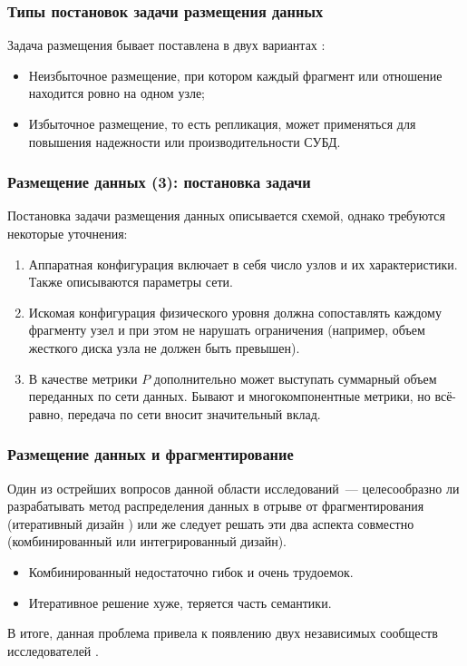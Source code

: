 \documentclass[unicode]{beamer}
\begin{document}
\begin{frame}
\frametitle{Типы постановок задачи размещения данных}

Задача размещения бывает поставлена в двух вариантах \cite{p32}:

\begin{itemize}
  \setlength\itemsep{1em}	
  \item Неизбыточное размещение, при котором каждый фрагмент или отношение находится ровно на одном узле;
  \item Избыточное размещение, то есть репликация, может применяться для повышения надежности или производительности СУБД.
\end{itemize}

\end{frame}


\begin{frame}
\frametitle{Размещение данных (3): постановка задачи}

Постановка задачи размещения данных описывается схемой, однако требуются некоторые уточнения:

\begin{enumerate}
  \setlength\itemsep{1em}	
  \item Аппаратная конфигурация включает в себя число узлов и их характеристики. Также описываются параметры сети.
  \item Искомая конфигурация физического уровня должна сопоставлять каждому фрагменту узел и при этом не нарушать ограничения (например, объем жесткого диска узла не должен быть превышен).
  \item В качестве метрики $P$ дополнительно может выступать суммарный объем переданных по сети данных. Бывают и многокомпонентные метрики, но всё-равно, передача по сети вносит значительный вклад. 
\end{enumerate}

\end{frame}

\begin{frame}

\frametitle{Размещение данных и фрагментирование}

\begin{block}{}
Один из острейших вопросов данной области исследований~--- целесообразно ли разрабатывать метод распределения данных в отрыве от фрагментирования (итеративный дизайн \cite{p29, p30}) или же следует решать эти два аспекта совместно (комбинированный или интегрированный \cite{p31} дизайн). 
\end{block}

\begin{itemize}
  \setlength\itemsep{1em}	
  \item Комбинированный недостаточно гибок и очень трудоемок.
  \item Итеративное решение хуже, теряется часть семантики.
\end{itemize}

В итоге, данная проблема привела к появлению двух независимых сообществ исследователей \cite{p29}.

\end{frame}
\end{document}
